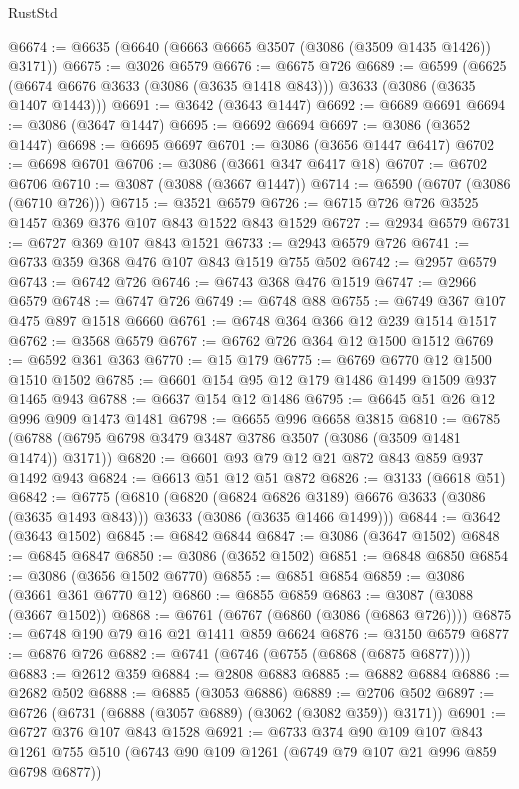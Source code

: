 \begin{lexlean}{RustStd}
\begin{coremodule}
@6674 := @6635 (@6640 (@6663 @6665 @3507 (@3086 (@3509 @1435 @1426)) @3171))
@6675 := @3026 @6579
@6676 := @6675 @726
@6689 := @6599
    (@6625 (@6674 @6676 @3633 (@3086 (@3635 @1418 @843))) @3633 (@3086 (@3635 @1407 @1443)))
@6691 := @3642 (@3643 @1447)
@6692 := @6689 @6691
@6694 := @3086 (@3647 @1447)
@6695 := @6692 @6694
@6697 := @3086 (@3652 @1447)
@6698 := @6695 @6697
@6701 := @3086 (@3656 @1447 @6417)
@6702 := @6698 @6701
@6706 := @3086 (@3661 @347 @6417 @18)
@6707 := @6702 @6706
@6710 := @3087 (@3088 (@3667 @1447))
@6714 := @6590 (@6707 (@3086 (@6710 @726)))
@6715 := @3521 @6579
@6726 := @6715 @726 @726 @3525 @1457 @369 @376 @107 @843 @1522 @843 @1529
@6727 := @2934 @6579
@6731 := @6727 @369 @107 @843 @1521
@6733 := @2943 @6579 @726
@6741 := @6733 @359 @368 @476 @107 @843 @1519 @755 @502
@6742 := @2957 @6579
@6743 := @6742 @726
@6746 := @6743 @368 @476 @1519
@6747 := @2966 @6579
@6748 := @6747 @726
@6749 := @6748 @88
@6755 := @6749 @367 @107 @475 @897 @1518 @6660
@6761 := @6748 @364 @366 @12 @239 @1514 @1517
@6762 := @3568 @6579
@6767 := @6762 @726 @364 @12 @1500 @1512
@6769 := @6592 @361 @363
@6770 := @15 @179
@6775 := @6769 @6770 @12 @1500 @1510 @1502
@6785 := @6601 @154 @95 @12 @179 @1486 @1499 @1509 @937 @1465 @943
@6788 := @6637 @154 @12 @1486
@6795 := @6645 @51 @26 @12 @996 @909 @1473 @1481
@6798 := @6655 @996 @6658 @3815
@6810 := @6785 (@6788 (@6795 @6798 @3479 @3487 @3786 @3507 (@3086 (@3509 @1481 @1474)) @3171))
@6820 := @6601 @93 @79 @12 @21 @872 @843 @859 @937 @1492 @943
@6824 := @6613 @51 @12 @51 @872
@6826 := @3133 (@6618 @51)
@6842 := @6775
    (@6810
      (@6820 (@6824 @6826 @3189) @6676 @3633 (@3086 (@3635 @1493 @843)))
      @3633
      (@3086 (@3635 @1466 @1499)))
@6844 := @3642 (@3643 @1502)
@6845 := @6842 @6844
@6847 := @3086 (@3647 @1502)
@6848 := @6845 @6847
@6850 := @3086 (@3652 @1502)
@6851 := @6848 @6850
@6854 := @3086 (@3656 @1502 @6770)
@6855 := @6851 @6854
@6859 := @3086 (@3661 @361 @6770 @12)
@6860 := @6855 @6859
@6863 := @3087 (@3088 (@3667 @1502))
@6868 := @6761 (@6767 (@6860 (@3086 (@6863 @726))))
@6875 := @6748 @190 @79 @16 @21 @1411 @859 @6624
@6876 := @3150 @6579
@6877 := @6876 @726
@6882 := @6741 (@6746 (@6755 (@6868 (@6875 @6877))))
@6883 := @2612 @359
@6884 := @2808 @6883
@6885 := @6882 @6884
@6886 := @2682 @502
@6888 := @6885 (@3053 @6886)
@6889 := @2706 @502
@6897 := @6726 (@6731 (@6888 (@3057 @6889) (@3062 (@3082 @359)) @3171))
@6901 := @6727 @376 @107 @843 @1528
@6921 := @6733
    @374
    @90
    @109
    @107
    @843
    @1261
    @755
    @510
    (@6743 @90 @109 @1261 (@6749 @79 @107 @21 @996 @859 @6798 @6877))

\end{coremodule}
\end{lexlean}
